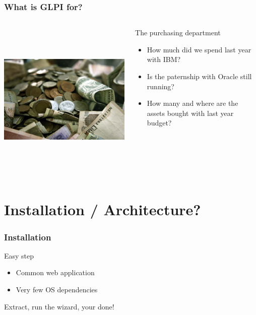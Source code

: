 \documentclass{beamer}
\begin{document}
\begin{frame}
    \frametitle{What is GLPI for?}

 \begin{columns}
 \begin{column}{0.35\textwidth}
         \includegraphics[height=7.5cm]{./pics/purchasing.jpg}
 \end{column}
 \begin{column}{0.65\textwidth}
    \begin{block}{The purchasing department}
        \begin{itemize}
            \item How much did we spend last year with IBM?
            \item Is the paternship with Oracle still running?
            \item How many and where are the assets bought with last year budget?
        \end{itemize}
    \end{block}
 \end{column}
\end{columns}
\end{frame}


\section{Installation / Architecture?}


\begin{frame}
    \frametitle{Installation}

    \begin{block}{Easy step}
        \begin{itemize}
            \item Common web application
            \item Very few OS dependencies
        \end{itemize}
    \end{block}

    Extract, run the wizard, your done!

\end{frame}
\end{document}
